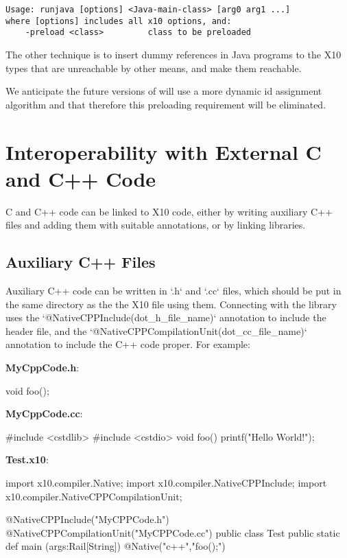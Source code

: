 \begin{verbatim}
Usage: runjava [options] <Java-main-class> [arg0 arg1 ...]
where [options] includes all x10 options, and:
    -preload <class>         class to be preloaded
\end{verbatim}

The other technique is to insert dummy references in Java programs to
the X10 types that are unreachable by other means, and make them
reachable.

We anticipate the future versions of \Xten{} will use a more dynamic
id assignment algorithm and that therefore this preloading requirement
will be eliminated.

\section{Interoperability with External C and C++ Code}

C and C++ code can be linked to X10 code, either by writing auxiliary C++ files and
adding them with suitable annotations, or by linking libraries.

\subsection{Auxiliary C++ Files}

Auxiliary C++ code can be written in \xcd`.h` and \xcd`.cc` files, which
should be put in the same directory as the the X10 file using them.
Connecting with the library uses the \xcd`@NativeCPPInclude(dot_h_file_name)`
annotation to include the header file, and the 
\xcd`@NativeCPPCompilationUnit(dot_cc_file_name)` annotation to include the
C++ code proper.  For example: 

{\bf MyCppCode.h}: 
\begin{xten}
void foo();
\end{xten}


{\bf MyCppCode.cc}:
\begin{xten}
#include <cstdlib>
#include <cstdio>
void foo() {
    printf("Hello World!\n");
}
\end{xten}

{\bf Test.x10}:
\begin{xten}
import x10.compiler.Native;
import x10.compiler.NativeCPPInclude;
import x10.compiler.NativeCPPCompilationUnit;

@NativeCPPInclude("MyCPPCode.h")
@NativeCPPCompilationUnit("MyCPPCode.cc")
public class Test {
    public static def main (args:Rail[String]) {
        { @Native("c++","foo();") {} }
    }
}
\end{xten}

